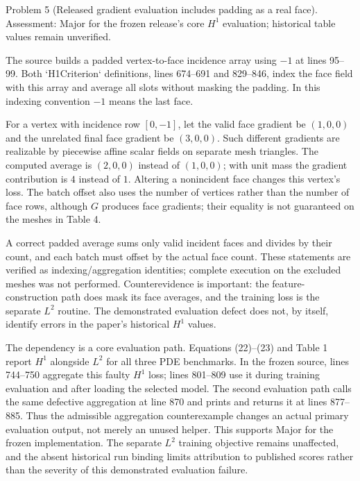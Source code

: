 \documentclass[10pt]{article}
\begin{document}
Problem 5 (Released gradient evaluation includes padding as a real face).  Assessment: Major for the frozen release’s core \(H^1\) evaluation; historical table values remain unverified.\par
The source builds a padded vertex-to-face incidence array using \(-1\) at lines 95–99. Both `H1Criterion` definitions, lines 674–691 and 829–846, index the face field with this array and average all slots without masking the padding. In this indexing convention \(-1\) means the last face.\par
For a vertex with incidence row \([0,-1]\), let the valid face gradient be \((1,0,0)\) and the unrelated final face gradient be \((3,0,0)\). Such different gradients are realizable by piecewise affine scalar fields on separate mesh triangles. The computed average is \((2,0,0)\) instead of \((1,0,0)\); with unit mass the gradient contribution is \(4\) instead of \(1\). Altering a nonincident face changes this vertex’s loss. The batch offset also uses the number of vertices rather than the number of face rows, although \(G\) produces face gradients; their equality is not guaranteed on the meshes in Table 4.\par
A correct padded average sums only valid incident faces and divides by their count, and each batch must offset by the actual face count. These statements are verified as indexing/aggregation identities; complete execution on the excluded meshes was not performed. Counterevidence is important: the feature-construction path does mask its face averages, and the training loss is the separate \(L^2\) routine. The demonstrated evaluation defect does not, by itself, identify errors in the paper’s historical \(H^1\) values.\par
The dependency is a core evaluation path. Equations (22)–(23) and Table 1 report \(H^1\) alongside \(L^2\) for all three PDE benchmarks. In the frozen source, lines 744–750 aggregate this faulty \(H^1\) loss; lines 801–809 use it during training evaluation and after loading the selected model. The second evaluation path calls the same defective aggregation at line 870 and prints and returns it at lines 877–885. Thus the admissible aggregation counterexample changes an actual primary evaluation output, not merely an unused helper. This supports Major for the frozen implementation. The separate \(L^2\) training objective remains unaffected, and the absent historical run binding limits attribution to published scores rather than the severity of this demonstrated evaluation failure.\par
\end{document}
